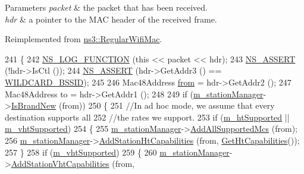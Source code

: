 \begin{DoxyParams}{Parameters}
{\em packet} & the packet that has been received. \\
\hline
{\em hdr} & a pointer to the M\+AC header of the received frame. \\
\hline
\end{DoxyParams}


Reimplemented from \hyperlink{classns3_1_1RegularWifiMac_a9abbbcea65b6dc416ab1b44785c40e9f}{ns3\+::\+Regular\+Wifi\+Mac}.


\begin{DoxyCode}
241 \{
242   \hyperlink{log-macros-disabled_8h_a90b90d5bad1f39cb1b64923ea94c0761}{NS\_LOG\_FUNCTION} (\textcolor{keyword}{this} << packet << hdr);
243   \hyperlink{assert_8h_a6dccdb0de9b252f60088ce281c49d052}{NS\_ASSERT} (!hdr->IsCtl ());
244   \hyperlink{assert_8h_a6dccdb0de9b252f60088ce281c49d052}{NS\_ASSERT} (hdr->GetAddr3 () == \hyperlink{namespacens3_aa7e7f97699766f2d1407d9151e3506a2}{WILDCARD\_BSSID});
245 
246   Mac48Address \hyperlink{lte__amc_8m_a1b4c81ff74eb1a626b5ade44c81004b3}{from} = hdr->GetAddr2 ();
247   Mac48Address to = hdr->GetAddr1 ();
248 
249   \textcolor{keywordflow}{if} (\hyperlink{classns3_1_1RegularWifiMac_a76d1a5e27b64bfe36f24a55d1eea2775}{m\_stationManager}->\hyperlink{classns3_1_1WifiRemoteStationManager_a7545940536c6520140bc7ff44b952d5d}{IsBrandNew} (from))
250     \{
251       \textcolor{comment}{//In ad hoc mode, we assume that every destination supports all}
252       \textcolor{comment}{//the rates we support.}
253       \textcolor{keywordflow}{if} (\hyperlink{classns3_1_1RegularWifiMac_a8950c44b8cf2ad1f9274821cf88adc7b}{m\_htSupported} || \hyperlink{classns3_1_1RegularWifiMac_a151f330fdeb3f83f9ec7cf07537f0e86}{m\_vhtSupported})
254         \{
255           \hyperlink{classns3_1_1RegularWifiMac_a76d1a5e27b64bfe36f24a55d1eea2775}{m\_stationManager}->\hyperlink{classns3_1_1WifiRemoteStationManager_a284f2ff0fb0cde5c8b08a3671712de58}{AddAllSupportedMcs} (from);
256           \hyperlink{classns3_1_1RegularWifiMac_a76d1a5e27b64bfe36f24a55d1eea2775}{m\_stationManager}->\hyperlink{classns3_1_1WifiRemoteStationManager_ae78d843a98a66ff2d8584da8ed189b4d}{AddStationHtCapabilities} (from, 
      \hyperlink{classns3_1_1RegularWifiMac_ae2b0a52735a938a0f1ca233397ae2185}{GetHtCapabilities}());
257         \}
258       \textcolor{keywordflow}{if} (\hyperlink{classns3_1_1RegularWifiMac_a151f330fdeb3f83f9ec7cf07537f0e86}{m\_vhtSupported})
259         \{
260           \hyperlink{classns3_1_1RegularWifiMac_a76d1a5e27b64bfe36f24a55d1eea2775}{m\_stationManager}->\hyperlink{classns3_1_1WifiRemoteStationManager_a52b9e283f99e113cba95afbc2acea72b}{AddStationVhtCapabilities} (from, 

\end{DoxyCode}

